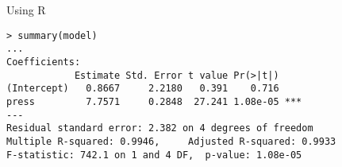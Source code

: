 \documentclass[smaller]{beamer}
\begin{document}
\begin{frame}[fragile]{Using R}
\begin{verbatim}
> summary(model)                                                                                                                                                                                                                                                               
...                                                                                                                                                                                                                                                                               
Coefficients:                                                                                                                                                                                                                                                                  
            Estimate Std. Error t value Pr(>|t|)                                                                                                                                                                                                                               
(Intercept)   0.8667     2.2180   0.391    0.716                                                                                                                                                                                                                               
press         7.7571     0.2848  27.241 1.08e-05 ***                                                                                                                                                                                                                           
---                                                                                                                                                                                                                                                                            
Residual standard error: 2.382 on 4 degrees of freedom                                                                                                                                                                                                                         
Multiple R-squared: 0.9946,     Adjusted R-squared: 0.9933                                                                                                                                                                                                                     
F-statistic: 742.1 on 1 and 4 DF,  p-value: 1.08e-05   
\end{verbatim}
 
\end{frame}
\end{document}
